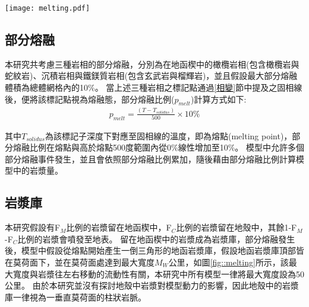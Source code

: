 \begin{figure*}[ht]
    \centering
    \texttt{[image: melting.pdf]}
    \caption[模型內岩漿作用示意圖。]{模型內岩漿作用示意圖。圖中繪製兩個不同的部分熔融事件。每個獨立部分熔融事件會對應獨立的岩漿庫。
    模型中有F$_M$比例的岩漿留在地函楔中，F$_C$比例的岩漿留在地殼中，其餘1-F$_M$-F$_C$比例的岩漿會噴發至地表形成火山島弧，如圖上方紅紫色三角形。
    地函岩漿庫中的岩漿均勻分布在圖中地函楔中紅橘色倒三角形。
    圖中假設部分熔融事件二的部分熔融體積為a$_2$地函岩漿庫體積為A$_{M2}$。
    }
    \label{fig::melting}
\end{figure*}

\subsection{部分熔融}\label{部分熔融}
本研究共考慮三種岩相的部分熔融，分別為在地函楔中的橄欖岩相(包含橄欖岩與蛇紋岩)、沉積岩相與鐵鎂質岩相(包含玄武岩與榴輝岩)，並且假設最大部分熔融體積為總體網格內的10$\%$。
當上述三種岩相之標記點通過\ref{相變}節中提及之固相線後，便將該標記點視為熔融態，部分熔融比例($p_{melt}$)計算方式如下:
\begin{align}
    p_{melt}=\frac{(T-T_{solidus})}{500}\times 10\% \label{eq:melting}
\end{align}

其中$T_{solidus}$為該標記子深度下對應至固相線的溫度，即為熔點(melting point)，部分熔融比例在熔點與高於熔點500度範圍內從0$\%$線性增加至10$\%$。
模型中允許多個部分熔融事件發生，並且會依照部分熔融比例累加，隨後藉由部分熔融比例計算模型中的岩漿量。

\subsection{岩漿庫}\label{岩漿庫}
本研究假設有F$_M$比例的岩漿留在地函楔中，F$_C$比例的岩漿留在地殼中，其餘1-F$_M$-F$_C$比例的岩漿會噴發至地表。
留在地函楔中的岩漿成為岩漿庫，部分熔融發生後，模型中假設從熔點開始產生一倒三角形的地函岩漿庫，假設地函岩漿庫頂部皆在莫荷面下，並在莫荷面處達到最大寬度$M_W$公里，如圖\ref{fig::melting}所示，該最大寬度與岩漿往左右移動的流動性有關，本研究中所有模型一律將最大寬度設為50公里。
由於本研究並沒有探討地殼中岩漿對模型動力的影響，因此地殼中的岩漿庫一律視為一垂直莫荷面的柱狀岩脈。

